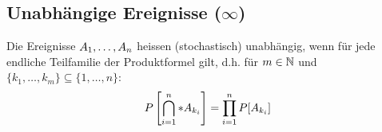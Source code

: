 \subsection*{Unabhängige Ereignisse  ($\infty$)}
Die Ereignisse $A_1, \dots, A_n$ heissen (stochastisch) unabhängig, wenn für jede
endliche Teilfamilie der Produktformel gilt, d.h. für $m \in \mathbb{N}$ und $\{k_1,
  \dots, k_m\} \subseteq \{1, \dots, n\}$:
\begin{align*}
  P \left[\bigcap_{i = 1}^n* A_{k_i} \right] = \prod_{i = 1}^n P[A_{k_i}]
\end{align*}
